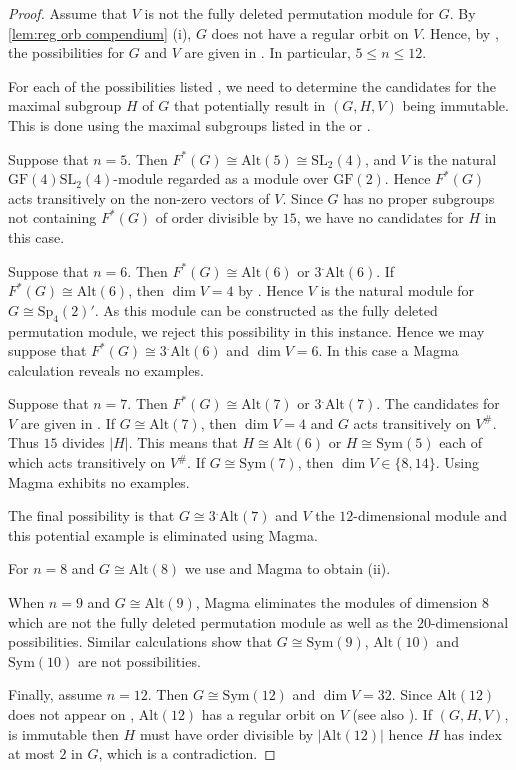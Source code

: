 \documentclass[12pt]{amsart}
\theoremstyle{remark}
\theoremstyle{notation}
\theoremstyle{definition}
\newcommand{\GF}{\mathrm{GF}}
\newcommand{\Sp}{\mathrm{Sp}}
\newcommand{\SL}{\mathrm{SL}}
\newcommand{\0}{\emptyset}
\newcommand{\Sym}{\mathrm{Sym}}
\newcommand{\Alt}{\mathrm{Alt}}
\begin{document}
\begin{proof} Assume that $V$ is not the fully deleted permutation module for $G$.
By \cref{lem:reg orb compendium} (i), $G$ does  not have a regular orbit on $V$.  Hence, by \cite[Theorem 1.1]{FOS},  the possibilities for $G$ and $V$ are given in    \cite[Table 1]{FOS}. In particular, $5\le n \le 12$.


For each of the possibilities listed \cite[Table 1]{FOS}, we need to determine the candidates for the maximal subgroup $H$ of $G$ that potentially result in $(G,H,V)$ being immutable.  This is done using the maximal subgroups listed in the \cite{ATLAS} or \cite{BHRoney}.

Suppose that $n=5$. Then $F^*(G) \cong \Alt(5)\cong \SL_2(4)$, and $V$ is the natural $\GF(4)\SL_2(4)$-module regarded as a module over $\GF(2)$. Hence $F^*(G)$ acts transitively on the non-zero vectors of $V$. Since $G$ has no proper subgroups not containing $F^*(G)$ of order divisible by $15$, we have no candidates for $H$ in this case.



Suppose that $n=6$. Then $F^*(G) \cong \Alt(6)$ or $3^.\Alt(6)$.
If $F^*(G) \cong \Alt(6)$, then $\dim V=4$ by \cite[Table 1]{FOS}. Hence $V$ is  the natural module for $G\cong \Sp_4(2)'$. As this module can be constructed as the fully deleted permutation module, we reject this possibility in this instance.
Hence we may suppose  that $F^*(G) \cong  3^.\Alt(6)$ and $\dim V=6$. In this case a {\sc Magma}  calculation reveals no examples.



 Suppose that $n=7$. Then $F^*(G) \cong \Alt(7) $ or $3^.\Alt(7)$. The candidates for $V$ are given in \cite[Table 1]{FOS}.
  If $G \cong \Alt(7)$, then $\dim V= 4$ and $G$ acts transitively on $V^\#$. Thus $15$ divides $|H|$.  This means that $H\cong \Alt(6)$ or $H \cong \Sym(5)$ each of which acts transitively on $V^\#$.
If $G \cong \Sym(7)$, then $\dim V \in \{8,14\}$. Using {\sc Magma} exhibits no examples.

The final possibility is that
  $G \cong 3^.\Alt(7)$ and $V$   the  $12$-dimensional module and this potential example is eliminated using {\sc Magma}.


For $n=8$ and $G \cong \Alt(8)$ we use  \cite[Table 1]{FOS} and {\sc Magma} to obtain (ii).

When $n=9$ and $G\cong \Alt(9)$,   {\sc Magma} eliminates the modules of dimension $8$ which are not the fully deleted permutation module as well as the $20$-dimensional possibilities.
Similar calculations show that  $G \cong \Sym(9)$, $\Alt(10)$ and $\Sym(10)$ are not possibilities.

Finally, assume $n=12$. Then $G \cong \Sym(12)$ and $\dim V= 32$. Since $\Alt(12)$ does not appear on  \cite[Table 1]{FOS}, $\Alt(12)$ has a regular orbit on $V$ (see also \cite[Proposition 4.6]{FOS}). If $(G,H,V)$, is immutable then $H$ must have order divisible by $|\Alt(12)|$ hence $H$ has index at most $2$ in $G$, which is a contradiction.
\end{proof}
\end{document}
